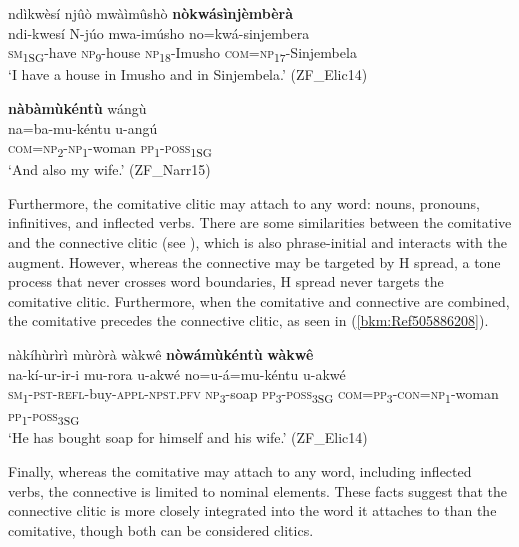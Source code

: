 \ea
\label{bkm:Ref437423816}
ndìkwèsí njûò mwàìmûshò \textbf{nòkwásìnjèmbèrà}\\
\gll ndi-kwesí  N-júo    mwa-imúsho  no=kwá-sinjembera\\
\textsc{sm}\textsubscript{1SG}-have  \textsc{np}\textsubscript{9}-house  \textsc{np}\textsubscript{18}-Imusho  \textsc{com}=\textsc{np}\textsubscript{17}-Sinjembela\\
\glt ‘I have a house in Imusho and in Sinjembela.’ (ZF\_Elic14)
\z

\ea
\label{bkm:Ref437423825}
\textbf{nàbàmùkéntù} wángù\\
\gll na=ba-mu-kéntu    u-angú\\
\textsc{com}=\textsc{np}\textsubscript{2}-\textsc{np}\textsubscript{1}-woman  \textsc{pp}\textsubscript{1}-\textsc{poss}\textsubscript{1SG}\\
\glt ‘And also my wife.’ (ZF\_Narr15)
\z

Furthermore, the comitative clitic may attach to any word: nouns, pronouns, infinitives, and inflected verbs. There are some similarities between the comitative and the connective clitic (see ), which is also phrase-initial and interacts with the augment. However, whereas the connective may be targeted by H spread, a tone process that never crosses word boundaries, H spread never targets the comitative clitic. Furthermore, when the comitative and connective are combined, the comitative precedes the connective clitic, as seen in (\ref{bkm:Ref505886208}).

\ea
\label{bkm:Ref505886208}
nàkíhùrìrì mùròrà wàkwê \textbf{nòwámùkéntù} \textbf{wàkwê}\\
\gll na-kí-ur-ir-i          mu-rora  u-akwé no=u-á=mu-kéntu      u-akwé\\
\textsc{sm}\textsubscript{1}-\textsc{pst}-\textsc{refl}-buy-\textsc{appl}-\textsc{npst}.\textsc{pfv}  \textsc{np}\textsubscript{3}-soap  \textsc{pp}\textsubscript{3}-\textsc{poss}\textsubscript{3SG}
\textsc{com}=\textsc{pp}\textsubscript{3}-\textsc{con}=\textsc{np}\textsubscript{1}-woman  \textsc{pp}\textsubscript{1}-\textsc{poss}\textsubscript{3SG}\\
\glt ‘He has bought soap for himself and his wife.’ (ZF\_Elic14)
\z

Finally, whereas the comitative may attach to any word, including inflected verbs, the connective is limited to nominal elements. These facts suggest that the connective clitic is more closely integrated into the word it attaches to than the comitative, though both can be considered clitics.

